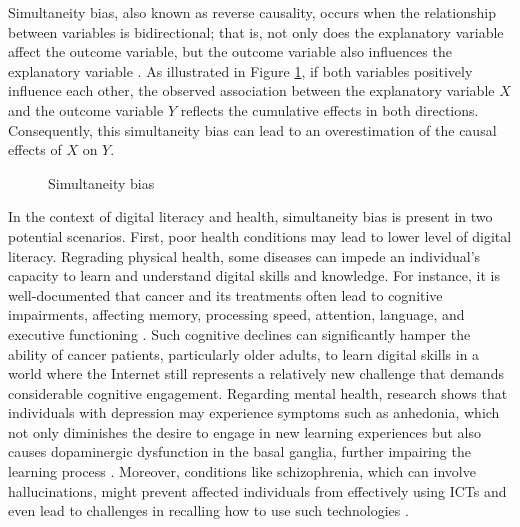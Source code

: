 Simultaneity bias, also known as reverse causality, occurs when the relationship between variables is bidirectional; that is, not only does the explanatory variable affect the outcome variable, but the outcome variable also influences the explanatory variable \parencite[p. 63]{freedman_specifying_2005}. As illustrated in Figure \ref{fig:sb}, if both variables positively influence each other, the observed association between the explanatory variable $X$ and the outcome variable $Y$ reflects the cumulative effects in both directions. Consequently, this simultaneity bias can lead to an overestimation of the causal effects of $X$ on $Y$. 

\begin{figure}[h!]
    \centering
    \caption{Simultaneity bias}
    \label{fig:sb}
\end{figure}

In the context of digital literacy and health, simultaneity bias is present in two potential scenarios. First, poor health conditions may lead to lower level of digital literacy. Regrading physical health, some diseases can impede an individual's capacity to learn and understand digital skills and knowledge. For instance, it is well-documented that cancer and its treatments often lead to cognitive impairments, affecting memory, processing speed, attention, language, and executive functioning \parencite{giovagnoli_investigation_2012,vonah_impact_2013}. Such cognitive declines can significantly hamper the ability of cancer patients, particularly older adults, to learn digital skills in a world where the Internet still represents a relatively new challenge that demands considerable cognitive engagement. Regarding mental health, research shows that individuals with depression may experience symptoms such as anhedonia, which not only diminishes the desire to engage in new learning experiences but also causes dopaminergic dysfunction in the basal ganglia, further impairing the learning process \parencite{herzallah_depression_2013}. Moreover, conditions like schizophrenia, which can involve hallucinations, might prevent affected individuals from effectively using ICTs and even lead to challenges in recalling how to use such technologies \parencite{greer_digital_2019}.

